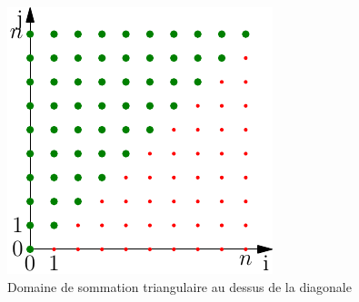 \begin{figure}[h]
  \centering
  \includegraphics{./Csomm5_1.pdf}
  \caption{Domaine de sommation triangulaire au dessus de la diagonale}
  \label{fig:Csomm5_1}
\end{figure}
